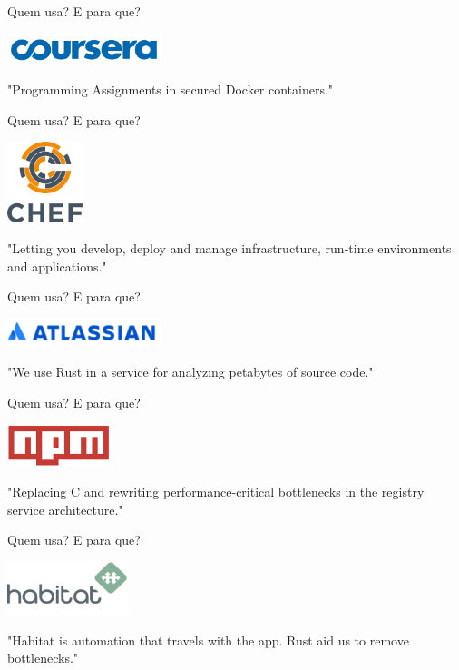 \documentclass[aspectratio=169]{beamer}
\begin{document}
\begin{frame}{Quem usa? E para que?}
	\begin{center}
		\includegraphics[width=4.5cm]{imgs/coursera.png}	
		
		"Programming Assignments in secured Docker containers."
	\end{center}
\end{frame}

\begin{frame}{Quem usa? E para que?}
	\begin{center}
		\includegraphics[width=2.2cm]{imgs/chef.png}	
		
		"Letting you develop, deploy and manage infrastructure, run-time environments and applications."
	\end{center}
\end{frame}

\begin{frame}{Quem usa? E para que?}
	\begin{center}
		\includegraphics[width=4.5cm]{imgs/atlassian.png}	
		
		"We use Rust in a service for analyzing petabytes of source code."
	\end{center}
\end{frame}

\begin{frame}{Quem usa? E para que?}
	\begin{center}
		\includegraphics[width=3.0cm]{imgs/npm.jpeg}	
		
		"Replacing C and rewriting performance-critical bottlenecks in the registry service architecture."
	\end{center}
\end{frame}

\begin{frame}{Quem usa? E para que?}
	\begin{center}
		\includegraphics[width=3.5cm]{imgs/habitat.png}	
		
		"Habitat is automation that travels with the app. Rust aid us to remove bottlenecks."
	\end{center}
\end{frame}
\end{document}
